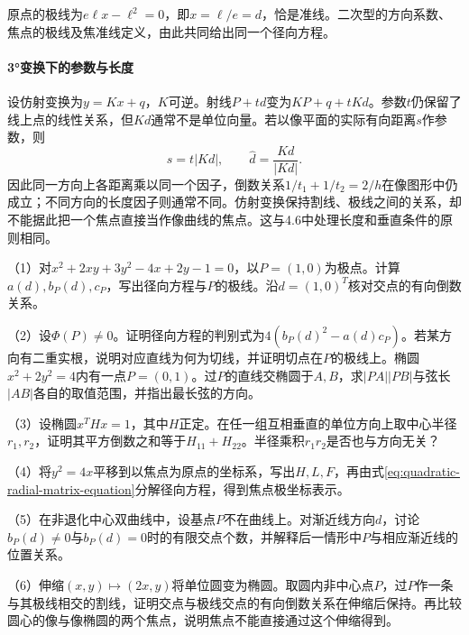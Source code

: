 原点的极线为\(e\ell x-\ell^2=0\)，即\(x=\ell/e=d\)，恰是准线。二次型的方向系数、焦点的极线及焦准线定义，由此共同给出同一个径向方程。

\paragraph{3°变换下的参数与长度} \mbox{}

设仿射变换为\(y=Kx+q\)，\(K\)可逆。射线\(P+td\)变为\(KP+q+tKd\)。参数\(t\)仍保留了线上点的线性关系，但\(Kd\)通常不是单位向量。若以像平面的实际有向距离\(s\)作参数，则
\begin{equation*}
 s=t|Kd|,\qquad \widehat d=\frac{Kd}{|Kd|}.
\end{equation*}
因此同一方向上各距离乘以同一个因子，倒数关系\(1/t_1+1/t_2=2/h\)在像图形中仍成立；不同方向的长度因子则通常不同。仿射变换保持割线、极线之间的关系，却不能据此把一个焦点直接当作像曲线的焦点。这与4.6中处理长度和垂直条件的原则相同。

\begin{exercise}
\mbox{}\par\nobreak
\begin{samepage}
（1）对\(x^2+2xy+3y^2-4x+2y-1=0\)，以\(P=(1,0)\)为极点。计算\(a(d),b_P(d),c_P\)，写出径向方程与\(P\)的极线。沿\(d=(1,0)^T\)核对交点的有向倒数关系。
\par\end{samepage}
\begin{samepage}
（2）设\(\Phi(P)\ne0\)。证明径向方程的判别式为\(4(b_P(d)^2-a(d)c_P)\)。若某方向有二重实根，说明对应直线为何为切线，并证明切点在\(P\)的极线上。椭圆\(x^2+2y^2=4\)内有一点\(P=(0,1)\)。过\(P\)的直线交椭圆于\(A,B\)，求\(|PA||PB|\)与弦长\(|AB|\)各自的取值范围，并指出最长弦的方向。
\par\end{samepage}
\begin{samepage}
（3）设椭圆\(x^THx=1\)，其中\(H\)正定。在任一组互相垂直的单位方向上取中心半径\(r_1,r_2\)，证明其平方倒数之和等于\(H_{11}+H_{22}\)。半径乘积\(r_1r_2\)是否也与方向无关？
\par\end{samepage}
\begin{samepage}
（4）将\(y^2=4x\)平移到以焦点为原点的坐标系，写出\(H,L,F\)，再由式\eqref{eq:quadratic-radial-matrix-equation}分解径向方程，得到焦点极坐标表示。
\par\end{samepage}
\begin{samepage}
（5）在非退化中心双曲线中，设基点\(P\)不在曲线上。对渐近线方向\(d\)，讨论\(b_P(d)\ne0\)与\(b_P(d)=0\)时的有限交点个数，并解释后一情形中\(P\)与相应渐近线的位置关系。
\par\end{samepage}
\begin{samepage}
（6）伸缩\((x,y)\mapsto(2x,y)\)将单位圆变为椭圆。取圆内非中心点\(P\)，过\(P\)作一条与其极线相交的割线，证明交点与极线交点的有向倒数关系在伸缩后保持。再比较圆心的像与像椭圆的两个焦点，说明焦点不能直接通过这个伸缩得到。
\par\end{samepage}
\end{exercise}
